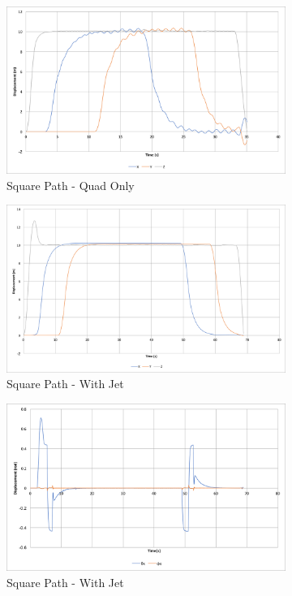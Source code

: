 \documentclass[10pt]{article}
\begin{document}
\begin{figure}[p]
    \centering
    \begin{subfigure}{0.72\textwidth}
        \includegraphics[width=\textwidth]{square_path_quad_only}
        \caption{Square Path - Quad Only}
        \label{fig:square_path_quad_only}
    \end{subfigure}

    \begin{subfigure}{0.72\textwidth}
        \includegraphics[width=\textwidth]{square_path_w_jet}
        \caption{Square Path - With Jet}
        \label{fig:square_path_w_jet}
    \end{subfigure}

    \begin{subfigure}{0.72\textwidth}
        \includegraphics[width=\textwidth]{square_path_w_jet_angle}
        \caption{Square Path - With Jet}
        \label{fig:square_path_w_jet_angle}
    \end{subfigure}
    \caption{}
\end{figure}
\end{document}

